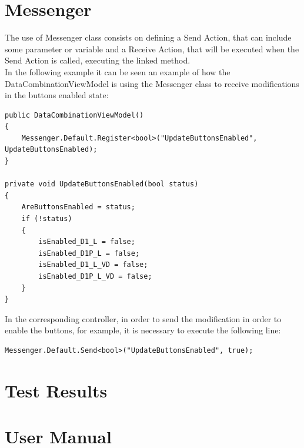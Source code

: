 \begin{appendices}
\clearpage
\section{Messenger}\label{ap:messenger}
The use of Messenger class consists on defining a Send Action, that can include some parameter or variable and a Receive Action, that will be executed when the Send Action is called, executing the linked method.\smallskip\\ 
In the following example it can be seen an example of how the DataCombinationViewModel is using the Messenger class to receive modifications in the buttons enabled state:\smallskip
\begin{lstlisting}
public DataCombinationViewModel()
{
    Messenger.Default.Register<bool>("UpdateButtonsEnabled", UpdateButtonsEnabled);
}   

private void UpdateButtonsEnabled(bool status)
{
    AreButtonsEnabled = status;
    if (!status)
    {
        isEnabled_D1_L = false;
        isEnabled_D1P_L = false;
        isEnabled_D1_L_VD = false;
        isEnabled_D1P_L_VD = false;
    }
}
\end{lstlisting}
In the corresponding controller, in order to send the modification in order to enable the buttons, for example, it is necessary to execute the following line:
\begin{lstlisting}
Messenger.Default.Send<bool>("UpdateButtonsEnabled", true);
\end{lstlisting}
\section{Test Results} \label{ap:test_results}


\section{User Manual} \label{ap:user_manual}


\end{appendices}